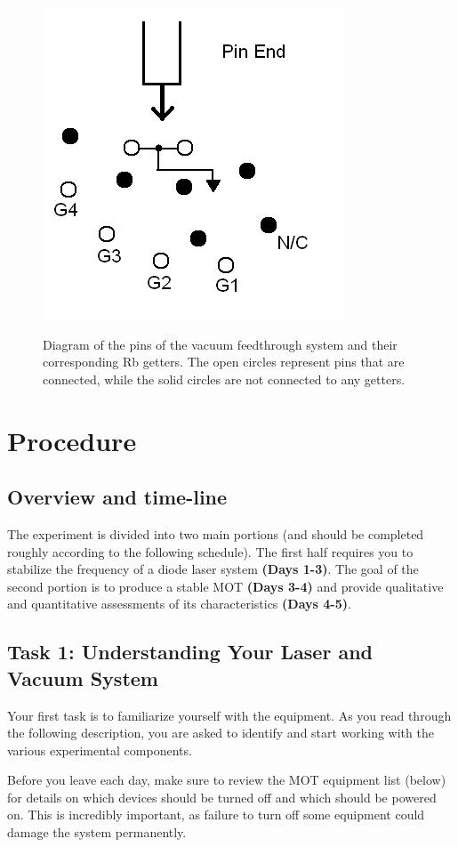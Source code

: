 \documentclass{../lab}
\begin{document}
\begin{figure}[h]
    \centering
    \href{http://experimentationlab.berkeley.edu/sites/default/files/images/MOT_Rb_getters2.png}{\includegraphics[width=0.35\linewidth]{images/MOT_Rb_getters2.png}}
    \caption{Diagram of the pins of the vacuum feedthrough system and their corresponding Rb getters. The open circles represent pins that are connected, while the solid circles are not connected to any getters.}
    \label{fig:MOT_Rb_getters2}
\end{figure}

\section{Procedure}

\subsection{Overview and time-line}

The experiment is divided into two main portions (and should be completed roughly according to the following schedule). The first half requires you to stabilize the frequency of a diode laser system \textbf{(Days 1-3)}. The goal of the second portion is to produce a stable MOT \textbf{(Days 3-4)} and provide qualitative and quantitative assessments of its characteristics \textbf{(Days 4-5)}.

\subsection{Task 1: Understanding Your Laser and Vacuum System}

Your first task is to familiarize yourself with the equipment. As you read through the following description, you are asked to identify and start working with the various experimental components.

Before you leave each day, make sure to review the MOT equipment list (below) for details on which devices should be turned off and which should be powered on. This is incredibly important, as failure to turn off some equipment could damage the system permanently.
\end{document}
